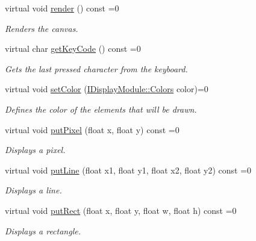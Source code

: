 \begin{DoxyCompactItemize}
\mbox{\label{classArcade_1_1Display_1_1IDisplayModule_a012f5804e7dc45515ef8e85e7ca8de5a}} 
virtual void \mbox{\hyperlink{classArcade_1_1Display_1_1IDisplayModule_a012f5804e7dc45515ef8e85e7ca8de5a}{render}} () const =0
\begin{DoxyCompactList}\small\item\em Renders the canvas. \end{DoxyCompactList}\item 
virtual char \mbox{\hyperlink{classArcade_1_1Display_1_1IDisplayModule_a403f8a0f065dad707a881ef3cee79805}{get\+Key\+Code}} () const =0
\begin{DoxyCompactList}\small\item\em Gets the last pressed character from the keyboard. \end{DoxyCompactList}\item 
virtual void \mbox{\hyperlink{classArcade_1_1Display_1_1IDisplayModule_a9f81148f93a249d6fc91307819911b4e}{set\+Color}} (\mbox{\hyperlink{classArcade_1_1Display_1_1IDisplayModule_ae0a776be9163d096051c522e21c007b2}{I\+Display\+Module\+::\+Colors}} color)=0
\begin{DoxyCompactList}\small\item\em Defines the color of the elements that will be drawn. \end{DoxyCompactList}\item 
virtual void \mbox{\hyperlink{classArcade_1_1Display_1_1IDisplayModule_a86a61eaa1d0cf2ddfdedbaa04054da90}{put\+Pixel}} (float x, float y) const =0
\begin{DoxyCompactList}\small\item\em Displays a pixel. \end{DoxyCompactList}\item 
virtual void \mbox{\hyperlink{classArcade_1_1Display_1_1IDisplayModule_a669da8dd0fc5360d11c735d68c17bc6e}{put\+Line}} (float x1, float y1, float x2, float y2) const =0
\begin{DoxyCompactList}\small\item\em Displays a line. \end{DoxyCompactList}\item 
virtual void \mbox{\hyperlink{classArcade_1_1Display_1_1IDisplayModule_a4c4072d7444006b9a0ba134c684e58b5}{put\+Rect}} (float x, float y, float w, float h) const =0
\begin{DoxyCompactList}\small\item\em Displays a rectangle. \end{DoxyCompactList}\item 

\end{DoxyCompactItemize}
